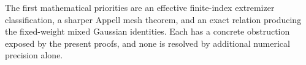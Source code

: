 The first mathematical priorities are an effective finite-index
extremizer classification, a sharper Appell mesh theorem, and an
exact relation producing the fixed-weight mixed Gaussian identities.
Each has a concrete obstruction exposed by the present proofs,
and none is resolved by additional numerical precision alone.
